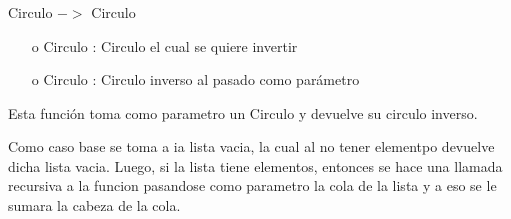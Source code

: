 \documentclass[10pt,journal]{IEEEtran}
\begin{document}
\subsubsection{\color{Red}{circuloInverso}}
\begin{description}[style=nextline]
        \item[\color{Green}{Signatura}] Circulo $->$ Circulo
        \begin{itemize} 
        \item [o] Circulo : Circulo el cual se quiere invertir
        \item [o] Circulo : Circulo inverso al pasado como parámetro
        \end{itemize}        
        
        \item[\color{Green}{Descripción}] Esta función toma como parametro un Circulo y devuelve su circulo inverso. 
        
        Como caso base se toma a ia lista vacia, la cual al no tener elementpo devuelve dicha lista vacia. Luego, si la lista tiene elementos, entonces se hace una llamada recursiva a la funcion pasandose como parametro  la cola de la lista y a eso se le sumara la cabeza de la cola. 
\end{description}
\end{document}
